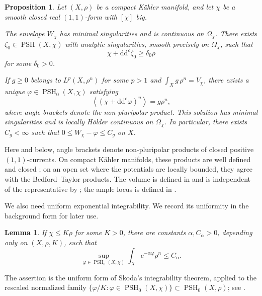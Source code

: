 \documentclass[oneside,english,letterpaper]{amsart}
\numberwithin{equation}{section}
\theoremstyle{plain}
\newtheorem{lem}[thm]{Lemma}
\newtheorem{prop}[thm]{Proposition}
\theoremstyle{definition}
\theoremstyle{remark}
\renewcommand{\d}{\mathrm{d}}
\newcommand{\ddc}{\d\d^c}
\begin{document}
\begin{prop}
	\label{prop:big-class-inputs}
	Let $(X,\rho)$ be a compact K\"ahler manifold, and let
	$\chi$ be a smooth closed real $(1,1)$-form with $[\chi]$
	big.
	
	The envelope $W_\chi$ has minimal singularities and is
	continuous on $\Omega_\chi$. There exists
	$\zeta_0\in\operatorname{PSH}(X,\chi)$ with analytic
	singularities, smooth precisely on $\Omega_\chi$, such that
	\begin{equation}
		\label{eq:strict-big-class-potential}
		\chi+\ddc\zeta_0\geq\delta_0\rho
	\end{equation}
	for some $\delta_0>0$.
	
	If $g\geq0$ belongs to $L^p(X,\rho^n)$ for some $p>1$ and
	$\int_Xg\,\rho^n=V_\chi$, there exists a unique
	$\varphi\in\operatorname{PSH}_0(X,\chi)$ satisfying
	$$
	\left\langle(\chi+\ddc\varphi)^n\right\rangle
	=g\rho^n,
	$$
	where angle brackets denote the non-pluripolar product.
	This solution has minimal singularities and is locally
	H\"older continuous on $\Omega_\chi$. In particular,
	there exists $C_g<\infty$ such that
	$0\leq W_\chi-\varphi\leq C_g$ on $X$.
\end{prop}

Here and below, angle brackets denote non-pluripolar products of
closed positive $(1,1)$-currents. On compact K\"ahler manifolds,
these products are well defined and closed
\cite[Proposition~1.6, Theorem~1.8]{MR2746347}; on an open set where
the potentials are locally bounded, they agree with the
Bedford--Taylor products. The volume is defined in
\cite[Definition~1.17]{MR2746347} and is independent of the
representative by \cite[Theorem~1.16]{MR2746347}; the ample locus is
defined in \cite[Definition~1.13]{MR2746347}.

We also need uniform exponential integrability. We record its
uniformity in the background form for later use.

\begin{lem}
	\label{lem:uniform-alpha-integrability}
	If $\chi\leq K\rho$ for some $K>0$, there are constants
	$\alpha,C_\alpha>0$, depending only on $(X,\rho,K)$, such that
	\begin{equation}
		\label{eq:uniform-alpha-integrability}
		\sup_{\varphi\in\operatorname{PSH}_0(X,\chi)}
		\int_Xe^{-\alpha\varphi}\rho^n\leq C_\alpha.
	\end{equation}
\end{lem}
The assertion is the uniform form of Skoda's integrability theorem,
applied to the rescaled normalized family
$\{\varphi/K:\varphi\in\operatorname{PSH}_0(X,\chi)\}\subset\operatorname{PSH}_0(X,\rho)$;
see \cite[proof of Proposition~4.3]{MR2746347}.
\end{document}
